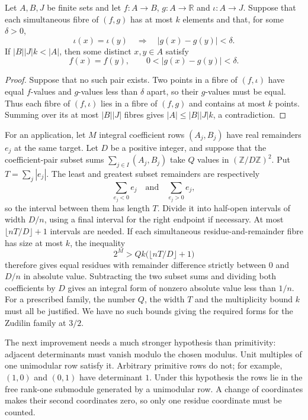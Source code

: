 \begin{theorem}\label{res:boundedfibre}
Let $A,B,J$ be finite sets and let $f:A\to B$, $g:A\to\mathbb R$ and
$\iota:A\to J$.  Suppose that each simultaneous fibre of $(f,g)$ has at
most $k$ elements and that, for some $\delta>0$,
\[
 \iota(x)=\iota(y)\quad\Longrightarrow\quad |g(x)-g(y)|<\delta.
\]
If $|B||J|k<|A|$, then some distinct $x,y\in A$ satisfy
\[
 f(x)=f(y),\qquad 0<|g(x)-g(y)|<\delta.
\]
\end{theorem}
\begin{proof}
Suppose that no such pair exists. Two points in a fibre of
$(f,\iota)$ have equal $f$-values and $g$-values less than $\delta$
apart, so their $g$-values must be equal. Thus each fibre of
$(f,\iota)$ lies in a fibre of $(f,g)$ and contains at most $k$
points. Summing over its at most $|B||J|$ fibres gives
$|A|\le |B||J|k$, a contradiction.
\end{proof}

For an application, let $M$ integral coefficient rows $(A_j,B_j)$ have
real remainders $e_j$ at the same target. Let $D$ be a positive integer,
and suppose that the coefficient-pair subset sums $\sum_{j\in I}(A_j,B_j)$
take $Q$ values in $(\mathbb Z/D\mathbb Z)^2$.
Put $T=\sum_j|e_j|$. The least and greatest
subset remainders are respectively
\[
 \sum_{e_j<0}e_j\quad\text{and}\quad\sum_{e_j>0}e_j,
\]
so the interval between them has length $T$. Divide it into half-open
intervals of width $D/n$, using a final interval for the right
endpoint if necessary. At most $\lfloor nT/D\rfloor+1$ intervals
are needed. If each simultaneous residue-and-remainder fibre has
size at most $k$, the inequality
\[
 2^M>Qk\bigl(\lfloor nT/D\rfloor+1\bigr)
\]
therefore gives equal residues with remainder difference strictly
between $0$ and $D/n$ in absolute value. Subtracting the two subset sums
and dividing both coefficients by $D$ gives an integral form
of nonzero absolute value less than $1/n$. For a prescribed family,
the number $Q$, the width $T$ and the multiplicity bound $k$ must
all be justified. We have no such bounds giving the required forms
for the Zudilin family at $3/2$.


The next improvement needs a much stronger hypothesis than
primitivity: adjacent determinants must vanish modulo the chosen
modulus. Unit multiples of one unimodular row satisfy it. Arbitrary
primitive rows do not; for example, $(1,0)$ and $(0,1)$ have determinant
$1$. Under this hypothesis the rows lie in the free rank-one submodule
generated by a unimodular row. A change of coordinates makes their
second coordinates zero, so only one residue coordinate must be
counted.

